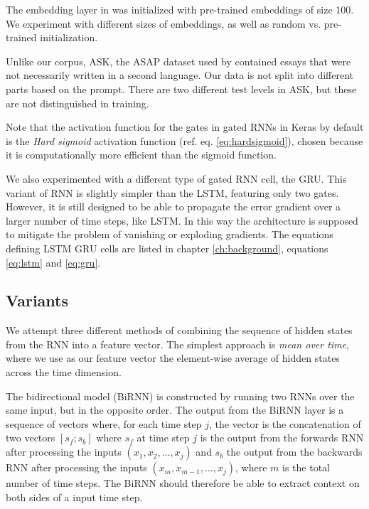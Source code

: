 The embedding layer in \textcite{taghipour16} was initialized with
pre-trained embeddings of size 100. We experiment with different sizes of
embeddings, as well as random vs. pre-trained initialization.

Unlike our corpus, ASK, the ASAP dataset used by \citeauthor{taghipour16}
contained essays that were not necessarily written in a second language. Our
data is not split into different parts based on the prompt. There are two
different test levels in ASK, but these are not distinguished in training.

Note that the activation function for the gates in gated RNNs in Keras by
default is the \emph{Hard sigmoid} activation function (ref. eq.
\ref{eq:hardsigmoid}), chosen because it is computationally more efficient
than the sigmoid function.

We also experimented with a different type of gated \ac{RNN} cell, the
\ac{GRU}. This variant of \ac{RNN} is slightly simpler than the \ac{LSTM},
featuring only two gates. However, it is still designed to be able to
propagate the error gradient over a larger number of time steps, like
\ac{LSTM}. In this way the architecture is supposed to mitigate the problem
of vanishing or exploding gradients. The equations defining \ac{LSTM}
\ac{GRU} cells are listed in chapter \ref{ch:background}, equations
\ref{eq:lstm} and \ref{eq:gru}.


\subsection{Variants}

We attempt three different methods of combining the sequence of hidden states
from the \ac{RNN} into a feature vector. The simplest approach is \emph{mean
over time}, where we use as our feature vector the element-wise average of
hidden states across the time dimension.

The bidirectional model (BiRNN) is constructed by running two \acp{RNN} over
the same input, but in the opposite order. The output from the BiRNN layer is
a sequence of vectors where, for each time step $j$, the vector is the
concatenation of two vectors $[s_f;s_b]$ where $s_f$ at time step $j$ is the
output from the forwards \ac{RNN} after processing the inputs $(x_1, x_2,
\ldots, x_j)$ and $s_b$ the output from the backwards \ac{RNN} after
processing the inputs $(x_m, x_{m-1}, \ldots, x_j)$, where $m$ is the total
number of time steps. The BiRNN should therefore be able to extract context
on both sides of a input time step.


